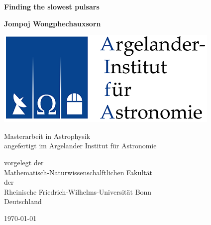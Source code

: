 \documentclass[a4paper, 9pt, twoside]{book}
\def\title{Finding the slowest pulsars}
\def\thesisauthor{Jompoj Wongphechauxsorn}
\begin{document}
    \frontmatter  %

    \begin{titlepage}
        \begin{center}
            \vspace{0.5cm}

            \Huge
            \textbf{\title}

            \vspace{0.5cm}
            \LARGE

            \vspace{1.5cm}

            \textbf{\thesisauthor}

            \vspace{4cm}

            \begin{center}
                \includegraphics{figures/logo_aifa}
            \end{center}

            \vfill

            Masterarbeit in Astrophysik\\
            angefertigt im Argelander Institut f\"ur Astronomie

            \vspace{0.5cm}

            \Large
            vorgelegt der \\
            Mathematisch-Naturwissenschalftlichen Fakult\"at \\
            der \\
            Rheinische Friedrich-Wilhelms-Universit\"at Bonn\\
            Deutschland

            \vspace{0.5cm}

            \LARGE
            \today

        \end{center}
    \end{titlepage}
\end{document}
